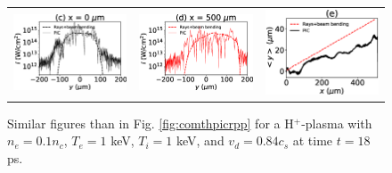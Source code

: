 \documentclass[%
 reprint,
 amsmath,amssymb,
 aps,
]{revtex4-1}
\begin{document}
\begin{figure}
\begin{tabular}{ccc}
\includegraphics[scale=0.39]{Figure/Icut0_te1keV_Ti1keV_.eps}
&\includegraphics[scale=0.39]{Figure/Icut500_te1keV_Ti1keV_.eps}
&\includegraphics[scale=0.39]{Figure/ymoy_te1keV_Ti1keV_.eps}
\end{tabular}
\caption{ \label{fig:comthpicrpp2} 
Similar figures than in Fig. \ref{fig:comthpicrpp} for a H$^{+}$-plasma with $n_e=0.1n_c$, $T_e=1$ keV, $T_i=1$ keV, and $v_d=0.84 c_s$ at time $t= 18$ ps.  }
\end{figure}
\end{document}
